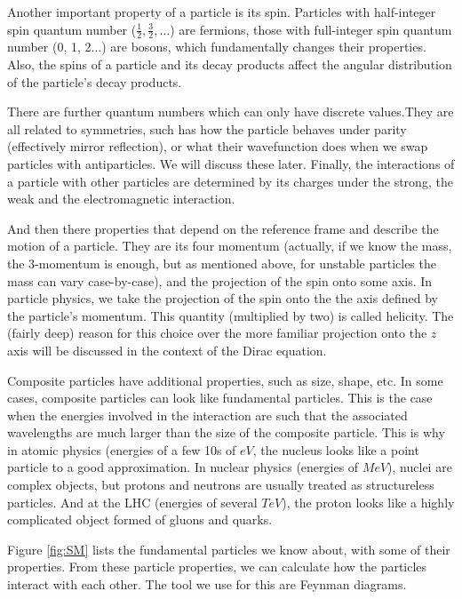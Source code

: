 Another important property of a particle is its spin. Particles with half-integer spin quantum number ($\frac{1}{2}, \frac{3}{2}, \ldots$)  are fermions, those with full-integer spin quantum number (0, 1, 2...) are bosons, which fundamentally changes their properties. Also, the spins of a particle and its decay products affect the angular distribution of the particle's decay products. 

There are further quantum numbers which can only have discrete values.They are all related to symmetries, such has how the particle behaves under parity (effectively mirror reflection), or what their wavefunction does when we swap particles with antiparticles.  We will discuss these later. Finally, the interactions of a particle with other particles are determined by its charges under the strong, the weak and the electromagnetic interaction.

And then there properties that depend on the reference frame and describe the motion of a particle. They are its four momentum (actually, if we know the mass, the 3-momentum is enough, but as mentioned above, for unstable particles the mass can vary case-by-case), and the projection of the spin onto some axis. In particle physics, we  take the projection of the spin onto the the axis defined by the particle's momentum. This quantity (multiplied by two) is called helicity. The (fairly deep) reason for this choice over the more familiar projection onto the $z$ axis will be discussed in the context of the Dirac equation.

Composite particles have additional properties, such as size, shape, etc. In some cases, composite particles can look like fundamental particles. This is the case when the energies involved in the interaction are such that the associated wavelengths are much larger than the size of the composite particle. This is why in atomic physics (energies of a few 10s of $eV$, the nucleus looks like a point particle to a good approximation. In nuclear physics (energies of $MeV$), nuclei are complex objects, but protons and neutrons are usually treated as structureless particles. And at the LHC (energies of several $TeV$), the proton looks like a highly complicated object formed of gluons and quarks.

Figure \ref{fig:SM} lists the fundamental particles we know about, with some of their properties. From these particle properties, we can calculate how the particles interact with each other. The tool we use for this are Feynman diagrams.

